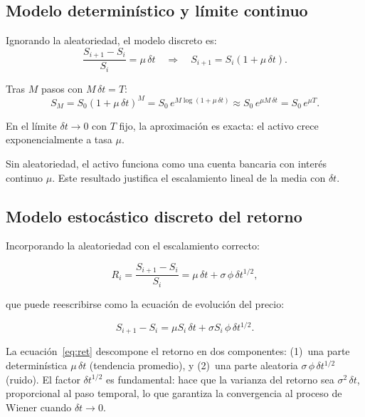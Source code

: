 \documentclass[12pt]{article}
\begin{document}
\subsection{Modelo determin\'istico y l\'imite continuo}

Ignorando la aleatoriedad, el modelo discreto es:
\[
  \frac{S_{i+1} - S_i}{S_i} = \mu\,\delta t
  \quad\Longrightarrow\quad
  S_{i+1} = S_i(1 + \mu\,\delta t).
\]

Tras $M$ pasos con $M\,\delta t = T$:
\[
  S_M = S_0(1 + \mu\,\delta t)^M = S_0\,e^{M\log(1+\mu\,\delta t)}
  \approx S_0\,e^{\mu M\,\delta t} = S_0\,e^{\mu T}.
\]

En el l\'imite $\delta t \to 0$ con $T$ fijo, la aproximaci\'on es exacta:
el activo crece exponencialmente a tasa $\mu$.

\begin{intuicion}
Sin aleatoriedad, el activo funciona como una cuenta bancaria con inter\'es continuo $\mu$.
Este resultado justifica el escalamiento lineal de la media con $\delta t$.
\end{intuicion}

\subsection{Modelo estoc\'astico discreto del retorno}

Incorporando la aleatoriedad con el escalamiento correcto:

\begin{equation}
  R_i = \frac{S_{i+1} - S_i}{S_i} = \mu\,\delta t + \sigma\,\phi\,\delta t^{1/2},
  \label{eq:ret}
\end{equation}

que puede reescribirse como la ecuaci\'on de evoluci\'on del precio:

\begin{equation}
  S_{i+1} - S_i = \mu S_i\,\delta t + \sigma S_i\,\phi\,\delta t^{1/2}.
  \label{eq:pricewalk}
\end{equation}

\begin{intuicionmat}
La ecuaci\'on~\eqref{eq:ret} descompone el retorno en dos componentes:
(1)~una parte determin\'istica $\mu\,\delta t$ (tendencia promedio),
y (2)~una parte aleatoria $\sigma\,\phi\,\delta t^{1/2}$ (ruido).
El factor $\delta t^{1/2}$ es fundamental: hace que la varianza del retorno sea
$\sigma^2\,\delta t$, proporcional al paso temporal, lo que garantiza la convergencia
al proceso de Wiener cuando $\delta t \to 0$.
\end{intuicionmat}
\end{document}
